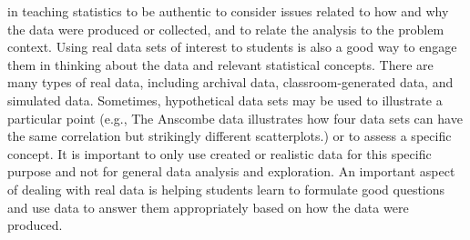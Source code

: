 \documentclass[twoside,openany]{tufte-book}
\begin{document}
 in teaching statistics to be authentic to consider issues related to how and why the data were produced or collected, and to relate the analysis to the problem context. Using real data sets of interest to students is also a good way to engage them in thinking about the data and relevant statistical concepts. There are many types of real data, including archival data, classroom-generated data, and simulated data. Sometimes, hypothetical data sets may be used to illustrate a particular point  (e.g., The Anscombe data illustrates how four data sets can have the same correlation but strikingly different scatterplots.) or to assess a specific concept. It is important to only use created or realistic data for this specific purpose and not for general data analysis and exploration. An important aspect of dealing with real data is helping students learn to formulate good questions and use data to answer them appropriately based on how the data were produced. 

\vspace{.2in}
\noindent {}
\end{document}
